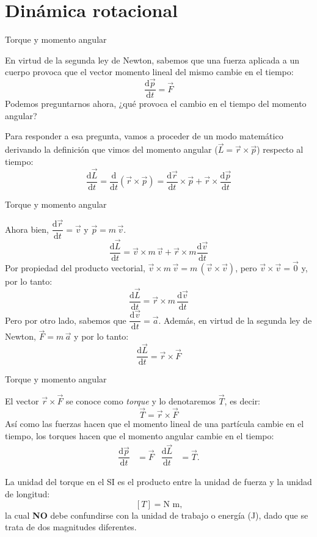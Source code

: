 \documentclass[11pt,handout,aspectratio=1610]{beamer}
\newcommand{\fdiff}[2]{\dfrac{\text{d} #1}{\text{d} #2}}
\newcommand{\vs}{\vspace{11pt}}
\begin{document}
\section{Dinámica rotacional}

\begin{frame}{Torque y momento angular}

    En virtud de la segunda ley de Newton, sabemos que una fuerza aplicada a un cuerpo provoca que el vector momento lineal del mismo cambie en el tiempo: $$\fdiff{\vec{p}}{t} = \vec{F} $$  Podemos preguntarnos ahora, ¿qué provoca el cambio en el tiempo del momento angular?

    \vs

    Para responder a esa pregunta, vamos a proceder de un modo matemático derivando la definición que vimos del momento angular ($\vec{L} = \vec{r} \times \vec{p}$) respecto al tiempo: $$\fdiff{\vec{L}}{t} = \fdiff{}{t} \left(\vec{r} \times \vec{p}\right) = \fdiff{\vec{r}}{t} \times \vec{p} + \vec{r} \times \fdiff{\vec{p}}{t}$$

\end{frame}

\begin{frame}{Torque y momento angular}

    Ahora bien, $\fdiff{\vec{r}}{t} = \vec{v}$ y $\vec{p} = m \, \vec{v}$.
    $$\fdiff{\vec{L}}{t} = \vec{v} \times m \, \vec{v} + \vec{r} \times m \fdiff{\vec{v}}{t}$$ Por propiedad del producto vectorial, $\vec{v} \times m \, \vec{v} = m \, \left(\vec{v} \times \vec{v}\right)$, pero $\vec{v} \times \vec{v} = \vec{0}$ y, por lo tanto: $$\fdiff{\vec{L}}{t} = \vec{r} \times m \, \fdiff{\vec{v}}{t}$$ Pero por otro lado, sabemos que $\fdiff{\vec{v}}{t} = \vec{a}$. Además, en virtud de la segunda ley de Newton, $\vec{F} = m \, \vec{a}$ y por lo tanto: $$\fdiff{\vec{L}}{t} = \vec{r} \times \vec{F}$$

\end{frame}

\begin{frame}{Torque y momento angular}

    El vector $\vec{r} \times \vec{F}$ se conoce como \emph{torque} y lo denotaremos $\vec{T}$, es decir: $$ \vec{T} = \vec{r} \times \vec{F} $$ Así como las fuerzas hacen que el momento lineal de una partícula cambie en el tiempo, los torques hacen que el momento angular cambie en el tiempo:
    \begin{align*}
        \fdiff{\vec{p}}{t} &= \vec{F}  & \fdiff{\vec{L}}{t} &= \vec{T}.
    \end{align*}

    La unidad del torque en el SI es el producto entre la unidad de fuerza y la unidad de longitud: $$ \left[T \right] = \text{N m,} $$ la cual \textbf{NO} debe confundirse con la unidad de trabajo o energía (J), dado que se trata de dos magnitudes diferentes.

\end{frame}
\end{document}
